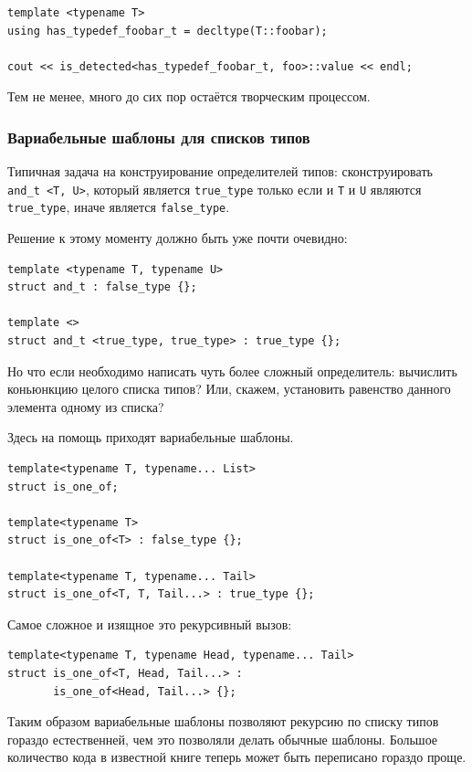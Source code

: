 \documentclass[a4paper,12pt,oneside]{article}
\begin{document}
\begin{lstlisting}
template <typename T> 
using has_typedef_foobar_t = decltype(T::foobar);

cout << is_detected<has_typedef_foobar_t, foo>::value << endl;
\end{lstlisting}

Тем не менее, много до сих пор остаётся творческим процессом.

\subsubsection{Вариабельные шаблоны для списков типов}

Типичная задача на конструирование определителей типов: сконструировать \lstinline!and_t <T, U>!, который является \lstinline!true_type! только если и \lstinline!T! и \lstinline!U! являются \lstinline!true_type!, иначе является \lstinline!false_type!.

Решение к этому моменту должно быть уже почти очевидно:

\begin{lstlisting}
template <typename T, typename U> 
struct and_t : false_type {};

template <> 
struct and_t <true_type, true_type> : true_type {};
\end{lstlisting}

Но что если необходимо написать чуть более сложный определитель: вычислить коньюнкцию целого списка типов? Или, скажем, установить равенство данного элемента одному из списка?

Здесь на помощь приходят вариабельные шаблоны.

\begin{lstlisting}
template<typename T, typename... List>
struct is_one_of;

template<typename T>
struct is_one_of<T> : false_type {};

template<typename T, typename... Tail>
struct is_one_of<T, T, Tail...> : true_type {};
\end{lstlisting}

Самое сложное и изящное это рекурсивный вызов:

\begin{lstlisting}
template<typename T, typename Head, typename... Tail>
struct is_one_of<T, Head, Tail...> : 
       is_one_of<Head, Tail...> {};
\end{lstlisting}

Таким образом вариабельные шаблоны позволяют рекурсию по списку типов гораздо естественней, чем это позволяли делать обычные шаблоны. Большое количество кода в известной книге \cite{mcpp} теперь может быть переписано гораздо проще.
\end{document}
